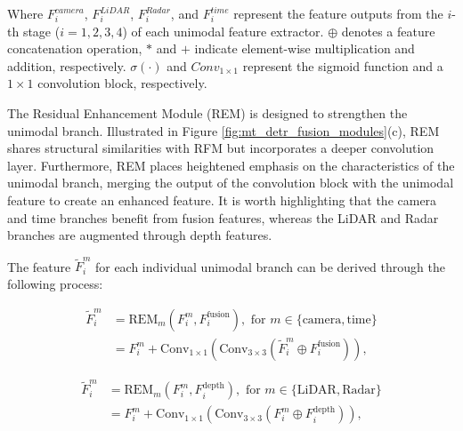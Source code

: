 \documentclass[report.tex]{subfiles}
\begin{document}
    Where $F_{i}^{camera}$, $F_{i}^{LiDAR}$, $F_{i}^{Radar}$, and $F_{i}^{time}$ represent the feature outputs from the $i$-th stage ($i = 1,2,3,4$) of each unimodal feature extractor. $\oplus$ denotes a feature concatenation operation, $*$ and $+$ indicate element-wise multiplication and addition, respectively. $\sigma(\cdot)$ and ${Conv}_{1\times1}$ represent the sigmoid function and a $1 \times 1$ convolution block, respectively.

    

    The Residual Enhancement Module (REM) is designed to strengthen the unimodal branch. Illustrated in Figure \ref{fig:mt_detr_fusion_modules}(c), REM shares structural similarities with RFM but incorporates a deeper convolution layer. Furthermore, REM places heightened emphasis on the characteristics of the unimodal branch, merging the output of the convolution block with the unimodal feature to create an enhanced feature. It is worth highlighting that the camera and time branches benefit from fusion features, whereas the LiDAR and Radar branches are augmented through depth features.

    The feature \(\tilde{F}_{i}^{m}\) for each individual unimodal branch can be derived through the following process:

    \begin{equation}
        \begin{split}
            \tilde{F}_{i}^{m} &= \text{REM}_{m} (F_{i}^{m}, F_{i}^{\text{fusion}}), \text{ for } m \in \{\text{camera}, \text{time}\} \\
            &= F_{i}^{m} + \text{Conv}_{1\times1}(\text{Conv}_{3\times3}(\tilde{F}_{i}^{m} \oplus F_{i}^{\text{fusion}})),
        \end{split}
    \end{equation}
    
    \begin{equation}
        \begin{split}
            \tilde{F}_{i}^{m} &= \text{REM}_{m} (F_{i}^{m}, F_{i}^{\text{depth}}), \text{ for } m \in \{\text{LiDAR}, \text{Radar}\} \\
            &= F_{i}^{m} + \text{Conv}_{1\times1}(\text{Conv}_{3\times3}(F_{i}^{m} \oplus F_{i}^{\text{depth}})),
        \end{split}
    \end{equation}  
\end{document}
